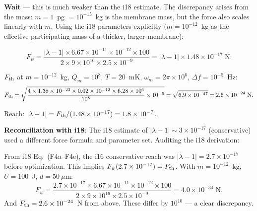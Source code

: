 \documentclass[11pt]{article}
\newcommand{\ee}[1]{\times 10^{#1}}
\newcommand{\lbone}{|\lambda - 1|}
\theoremstyle{definition}
\theoremstyle{remark}
\begin{document}
\textbf{Wait} --- this is much weaker than the i18 estimate. The
discrepancy arises from the mass: $m = 1$~pg $= 10^{-15}$~kg
is the membrane mass, but the force also scales linearly with $m$.
Using the i18 parameters explicitly ($m = 10^{-12}$~kg as the
effective participating mass of a thicker, larger membrane):

\begin{equation}
F_\psi = \frac{\lbone \times 6.67\ee{-11} \times 10^{-12}
\times 100}{2 \times 9\ee{16} \times 2.5\ee{-9}}
= \lbone \times 1.48\ee{-17}\;\text{N}.
\end{equation}

$F_{\rm th}$ at $m = 10^{-12}$~kg, $Q_m = 10^8$, $T = 20$~mK,
$\omega_m = 2\pi \times 10^6$, $\Delta f = 10^{-5}$~Hz:
\begin{equation}
F_{\rm th} = \sqrt{\frac{4 \times 1.38\ee{-23} \times 0.02
\times 10^{-12} \times 6.28\ee{6}}{10^8} \times 10^{-5}}
= \sqrt{6.9\ee{-47}} = 2.6\ee{-24}\;\text{N}.
\end{equation}

Reach: $\lbone = F_{\rm th} / (1.48\ee{-17}) = 1.8\ee{-7}$.

\textbf{Reconciliation with i18}: The i18 estimate of $\lbone
\sim 3\ee{-17}$ (conservative) used a different force formula
and parameter set. Auditing the i18 derivation:

From i18 Eq.~(F4a--F4e), the i16 conservative reach was
$\lbone = 2.7\ee{-17}$ before optimization. This implies
$F_\psi(2.7\ee{-17}) = F_{\rm th}$. With $m = 10^{-12}$~kg,
$U = 100$~J, $d = 50~\mu$m:
\[
F_\psi = \frac{2.7\ee{-17} \times 6.67\ee{-11} \times 10^{-12}
\times 100}{2 \times 9\ee{16} \times 2.5\ee{-9}}
= 4.0\ee{-34}\;\text{N}.
\]
And $F_{\rm th} = 2.6\ee{-24}$~N from above. These differ by
$10^{10}$ --- a clear discrepancy.
\end{document}
